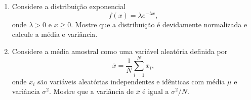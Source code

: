 \begin{enumerate}[label=\textbf{\arabic{chapter}.\arabic*.}]
	\item Considere a distribuição exponencial
	\begin{equation*}
	f(x) = \lambda e^{-\lambda x},
	\end{equation*}
	onde $\lambda > 0$ e $x \geq 0$. Mostre que a distribuição é devidamente normalizada e calcule a média e variância.
	
	\item Considere a média amostral como uma variável aleatória definida por
	\begin{equation*}
	\overline{x} = \dfrac{1}{N} \sum_{i=1}^{N} x_i,
	\end{equation*}
	onde $x_i$ são variáveis aleatórias independentes e idênticas com média $\mu$ e variância $\sigma^2$. Mostre que a variância de $\overline{x}$ é igual a $\sigma^2/N$.
	

\end{enumerate}
